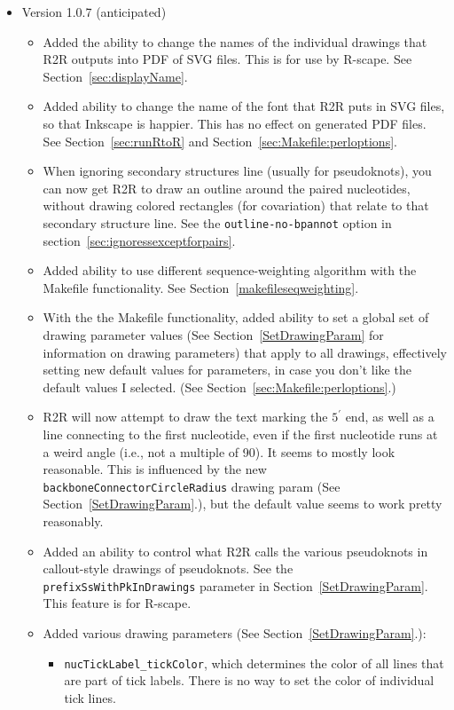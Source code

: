 \documentclass[letterpaper,12pt]{report}
\begin{document}
\begin{itemize}
\item Version 1.0.7 (anticipated)
  \begin{itemize}
  \item Added the ability to change the names of the individual drawings that R2R outputs into PDF of SVG files.  This is for use by R-scape.  See Section~\ref{sec:displayName}.
  \item Added ability to change the name of the font that R2R puts in SVG files, so that Inkscape is happier.  This has no effect on generated PDF files.  See Section~\ref{sec:runRtoR} and Section~\ref{sec:Makefile:perloptions}.
  \item When ignoring secondary structures line (usually for pseudoknots), you can now get R2R to draw an outline around the paired nucleotides, without drawing colored rectangles (for covariation) that relate to that secondary structure line.  See the {\tt outline-no-bpannot} option in section~\ref{sec:ignoressexceptforpairs}.
  \item Added ability to use different sequence-weighting algorithm with the Makefile functionality.  See Section~\ref{makefileseqweighting}.
  \item With the the Makefile functionality, added ability to set a global set of drawing parameter values (See Section~\ref{SetDrawingParam} for information on drawing parameters) that apply to all drawings, effectively setting new default values for parameters, in case you don't like the default values I selected.  (See Section~\ref{sec:Makefile:perloptions}.)
  \item R2R will now attempt to draw the text marking the $5^\prime$ end, as well as a line connecting to the first nucleotide, even if the first nucleotide runs at a weird angle (i.e., not a multiple of 90).  It seems to mostly look reasonable.  This is influenced by the new {\tt backboneConnectorCircleRadius} drawing param (See Section~\ref{SetDrawingParam}.), but the default value seems to work pretty reasonably.
    \item Added an ability to control what R2R calls the various pseudoknots in callout-style drawings of pseudoknots.  See the {\tt prefixSsWithPkInDrawings} parameter in Section~\ref{SetDrawingParam}.  This feature is for R-scape.
  \item Added various drawing parameters (See Section~\ref{SetDrawingParam}.):
    \begin{itemize}
    \item {\tt nucTickLabel\_tickColor}, which determines the color of all lines that are part of tick labels.  There is no way to set the color of individual tick lines.

\end{itemize}
\end{itemize}
\end{itemize}
\end{document}
